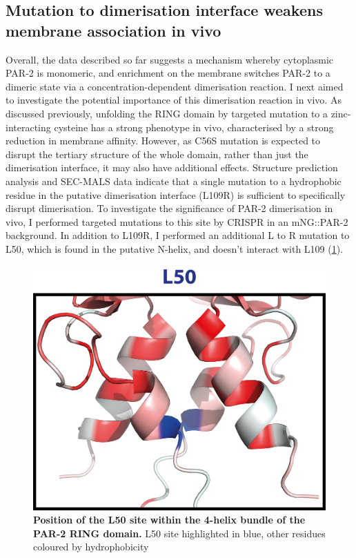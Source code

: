 \documentclass[12pt]{"report"}
\newcommand{\mycaption}[2]{\caption[#1]{\textbf{#1.} #2}}
\begin{document}
\subsection{Mutation to dimerisation interface weakens membrane association in vivo}

Overall, the data described so far suggests a mechanism whereby cytoplasmic PAR-2 is monomeric, and enrichment on the membrane switches PAR-2 to a dimeric state via a concentration-dependent dimerisation reaction. I next aimed to investigate the potential importance of this dimerisation reaction in vivo. As discussed previously, unfolding the RING domain by targeted mutation to a zinc-interacting cysteine has a strong phenotype in vivo, characterised by a strong reduction in membrane affinity. However, as C56S mutation is expected to disrupt the tertiary structure of the whole domain, rather than just the dimerisation interface, it may also have additional effects. Structure prediction analysis and SEC-MALS data indicate that a single mutation to a hydrophobic residue in the putative dimerisation interface (L109R) is sufficient to specifically disrupt dimerisation. To investigate the significance of PAR-2 dimerisation in vivo, I performed targeted mutations to this site by CRISPR in an mNG::PAR-2 background. In addition to L109R, I performed an additional L to R mutation to L50, which is found in the putative N-helix, and doesn't interact with L109 (\cref{fig:l50_structure}).\\

\begin{figure}
\includegraphics[scale=0.8]{l50_structure}
\mycaption{Position of the L50 site within the 4-helix bundle of the PAR-2 RING domain}{L50 site highlighted in blue, other residues coloured by hydrophobicity}
\label{fig:l50_structure}
\end{figure}
\end{document}
